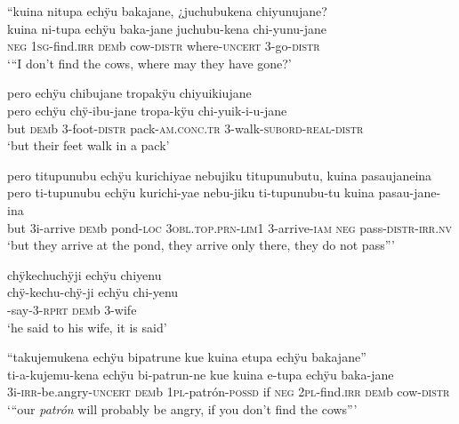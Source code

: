 \ea%
\begingl 
\glpreamble “kuina nitupa echÿu bakajane, ¿juchubukena chiyunujane?\\
\gla kuina ni-tupa echÿu baka-jane juchubu-kena chi-yunu-jane\\ 
\glb \textsc{neg} 1\textsc{sg}-find.\textsc{irr} \textsc{dem}b cow-\textsc{distr} where-\textsc{uncert} 3-go-\textsc{distr}\\ 
\glft ‘“I don’t find the cows, where may they have gone?’\\ 
\endgl
\xe

\ea%
\begingl 
\glpreamble pero echÿu chibujane tropakÿu chiyuikiujane \\
\gla pero echÿu chÿ-ibu-jane tropa-kÿu chi-yuik-i-u-jane \\ 
\glb but \textsc{dem}b 3-foot-\textsc{distr} pack-\textsc{am.conc.tr} 3-walk-\textsc{subord}-\textsc{real}-\textsc{distr} \\ 
\glft ‘but their feet walk in a pack’\\ 
\endgl
\xe

\ea%
\begingl 
\glpreamble pero titupunubu echÿu kurichiyae nebujiku titupunubutu, kuina pasaujaneina\\
\gla pero ti-tupunubu echÿu kurichi-yae nebu-jiku ti-tupunubu-tu kuina pasau-jane-ina\\ 
\glb but 3i-arrive \textsc{dem}b pond-\textsc{loc} 3\textsc{obl.top.prn}-\textsc{lim}1 3-arrive-\textsc{iam} \textsc{neg} pass-\textsc{distr}-\textsc{irr.nv}\\ 
\glft ‘but they arrive at the pond, they arrive only there, they do not pass”’\\ 
\endgl
\xe

\ea%
\begingl 
\glpreamble chÿkechuchÿji echÿu chiyenu\\
\gla chÿ-kechu-chÿ-ji echÿu chi-yenu\\ 
-say-3-\textsc{rprt} \textsc{dem}b 3-wife\\ 
\glft ‘he said to his wife, it is said’\\ 
\endgl
\xe

\ea%
\begingl 
\glpreamble “takujemukena echÿu bipatrune kue kuina etupa echÿu bakajane”\\
\gla ti-a-kujemu-kena echÿu bi-patrun-ne kue kuina e-tupa echÿu baka-jane\\ 
\glb 3i-\textsc{irr}-be.angry-\textsc{uncert} \textsc{dem}b 1\textsc{pl}-patrón-\textsc{possd} if \textsc{neg} 2\textsc{pl}-find.\textsc{irr} \textsc{dem}b cow-\textsc{distr}\\ 
\glft ‘“our \textit{patrón} will probably be angry, if you don’t find the cows”’\\ 
\endgl
\xe

